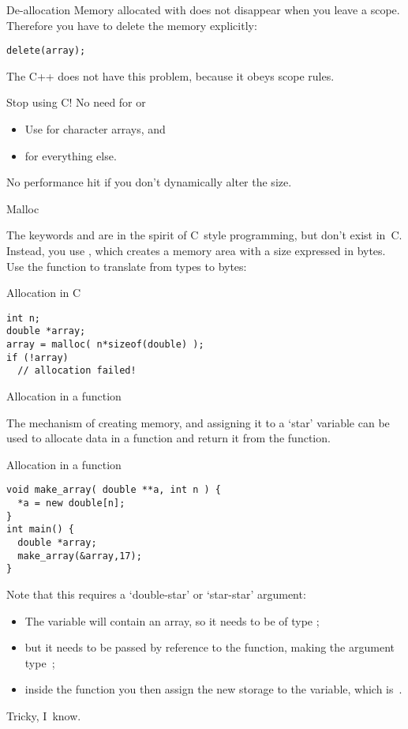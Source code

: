 \begin{block}{De-allocation}
  \label{sl:c-array-del}
  Memory allocated with  does not disappear when you leave a
  scope. Therefore you have to delete the memory explicitly:
\begin{lstlisting}
delete(array);
\end{lstlisting}
The C++  does not have this problem, because it obeys scope rules.
\end{block}

\begin{block}{Stop using C!}
  \label{sl:no-c-malloc}
  No need for  or 
  \begin{itemize}
  \item Use  for character arrays, and
  \item {} for everything else.
  \end{itemize}
  No performance hit if you don't dynamically alter the size.
\end{block}

 {Malloc}

The keywords  and  are in the spirit of C~style
programming, but don't exist in~C. Instead, you use
, which creates a memory area with a size
expressed in bytes. Use the function  to translate
from types to bytes:

\begin{block}{Allocation in C}
\begin{lstlisting}
int n;
double *array;
array = malloc( n*sizeof(double) );
if (!array)
  // allocation failed!
\end{lstlisting}
\end{block}

 {Allocation in a function}

The mechanism of creating memory, and assigning it to a `star'
variable
can be used to allocate data in a function and
return it from the function.

\begin{block}{Allocation in a function}
\begin{lstlisting}
void make_array( double **a, int n ) {
  *a = new double[n];
}
int main() {
  double *array;
  make_array(&array,17);
}
\end{lstlisting}
\end{block}

Note that this requires a `double-star' or `star-star' argument:
\begin{itemize}
\item The variable  will contain an array, so it needs to be of
  type ;
\item but it needs to be passed by reference to the function, making
  the argument type~;
\item inside the function you then assign the new storage to the
   variable, which is~.
\end{itemize}
Tricky, I~know.

